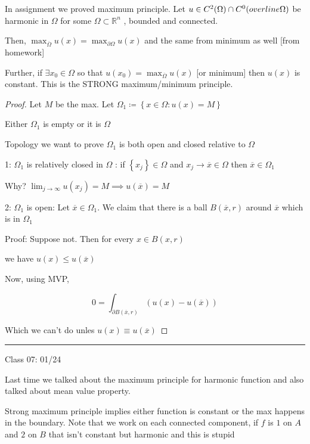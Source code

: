 \documentclass{article}
\theoremstyle{definition}
\begin{document}
In assignment we proved maximum principle. Let \(u\in C^2(\Omega ) \cap C^0(\\overline{ \Omega })\) be harmonic in \(\Omega \) for some \(\Omega \subset \mathbb{R} ^n\) , bounded and connected.

Then, \(\max_{\overline{\Omega} }u(x)=\max _{\partial \Omega} u(x)\) and the same from minimum as well [from homework]

Further, if \(\exists x_0\in \Omega \) so that \(u(x_0)=\max_{\overline{\Omega} }u(x)\) [or minimum] then \(u(x)\) is constant. This is the STRONG maximum/minimum principle.

\begin{proof}
    Let \(M\) be the max. Let \(\Omega_1 \coloneqq \left\{ x\in \Omega : u(x)=M \right\} \) 

    Either \(\Omega _1\) is empty or it is \(\Omega\) 

    Topology we want to prove \(\Omega _1\) is both open and closed relative to \(\Omega\) 

    1: \(\Omega _1\) is relatively closed in \(\Omega\) : if \(\left\{ x_j \right\} \in \Omega \) and \(x_j \to \overline{x} \in \Omega\) then \(\overline{x} \in \Omega _1\)
    
    Why? \(\lim_{j \to \infty} u(x_j)=M \implies u(\overline{x} )=M \) 

    2: \(\Omega_1\) is open: Let \(\overline{x} \in \Omega_1\). We claim that there is a ball \(B(\overline{x},r)\) around \(\overline{x}\) which is in \(\Omega_1\)

    Proof: Suppose not. Then for every \(x \in B(x,r) \)

    we have \(u(x)\leq u(\overline{x})\) 

    Now, using MVP,

    \[
        0 = \int_{\partial B(\overline{x} , r)}^{} (u(x)-u(\overline{x} ))  
    \]

    Which we can't do unles \(u(x)\equiv u(\overline{x} )\) 

\end{proof}

\hfil
\hrule

Class 07: 01/24
 
Last time we talked about the maximum principle for harmonic function and also talked about mean value property.

Strong maximum principle implies either function is constant or the max happens in the boundary. Note that we work on each connected component, if \(f\) is \(1\) on \(A\) and \(2\) on \(B\) that isn't constant but harmonic and this is stupid
\end{document}

